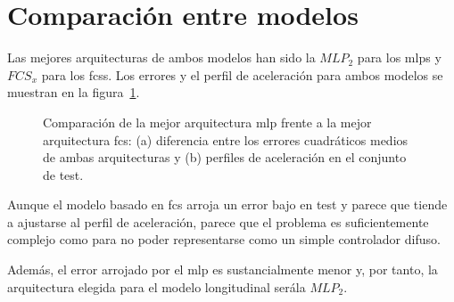 \section{Comparación entre modelos}

Las mejores arquitecturas de ambos modelos han sido la $MLP_2$ para los \acp{mlp} y $FCS_x$ para los \acp{fcs}. Los errores y el perfil de aceleración para ambos modelos se muestran en la figura~\ref{fig:cf-comparison-between-best-mlp-and-fcs-architecture}.

\begin{figure}
	\centering
	\qquad
	\caption[Comparación entre los dos tipos de modelo longitudinal]{Comparación de la mejor arquitectura \ac{mlp} frente a la mejor arquitectura \ac{fcs}: (a) diferencia entre los errores cuadráticos medios de ambas arquitecturas y (b) perfiles de aceleración en el conjunto de test.}
	\label{fig:cf-comparison-between-best-mlp-and-fcs-architecture}
\end{figure}

Aunque el modelo basado en \ac{fcs} arroja un error bajo en test y parece que tiende a ajustarse al perfil de aceleración, parece que el problema es suficientemente complejo como para no poder representarse como un simple controlador difuso.

Además, el error arrojado por el \ac{mlp} es sustancialmente menor y, por tanto, la arquitectura elegida para el modelo longitudinal serála $MLP_2$.